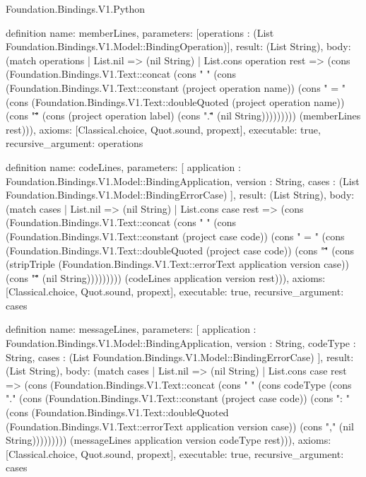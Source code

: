 \begin{lexlean}{Foundation.Bindings.V1.Python}
\begin{semanticmodule}
definition{
  name: memberLines,
  parameters: [operations : (List Foundation.Bindings.V1.Model::BindingOperation)],
  result: (List String),
  body: (match operations
    | List.nil => (nil String)
    | List.cons operation rest => (cons (Foundation.Bindings.V1.Text::concat (cons "    " (cons (Foundation.Bindings.V1.Text::constant (project operation name)) (cons " = " (cons (Foundation.Bindings.V1.Text::doubleQuoted (project operation name)) (cons "\n    \"\"\"" (cons (project operation label) (cons ".\"\"\"" (nil String))))))))) (memberLines rest))),
  axioms: [Classical.choice, Quot.sound, propext],
  executable: true,
  recursive_argument: operations
}

definition{
  name: codeLines,
  parameters: [
    application : Foundation.Bindings.V1.Model::BindingApplication,
    version : String,
    cases : (List Foundation.Bindings.V1.Model::BindingErrorCase)
  ],
  result: (List String),
  body: (match cases
    | List.nil => (nil String)
    | List.cons case rest => (cons (Foundation.Bindings.V1.Text::concat (cons "    " (cons (Foundation.Bindings.V1.Text::constant (project case code)) (cons " = " (cons (Foundation.Bindings.V1.Text::doubleQuoted (project case code)) (cons "\n    \"\"\"" (cons (stripTriple (Foundation.Bindings.V1.Text::errorText application version case)) (cons "\"\"\"" (nil String))))))))) (codeLines application version rest))),
  axioms: [Classical.choice, Quot.sound, propext],
  executable: true,
  recursive_argument: cases
}

definition{
  name: messageLines,
  parameters: [
    application : Foundation.Bindings.V1.Model::BindingApplication,
    version : String,
    codeType : String,
    cases : (List Foundation.Bindings.V1.Model::BindingErrorCase)
  ],
  result: (List String),
  body: (match cases
    | List.nil => (nil String)
    | List.cons case rest => (cons (Foundation.Bindings.V1.Text::concat (cons "    " (cons codeType (cons "." (cons (Foundation.Bindings.V1.Text::constant (project case code)) (cons ": " (cons (Foundation.Bindings.V1.Text::doubleQuoted (Foundation.Bindings.V1.Text::errorText application version case)) (cons "," (nil String))))))))) (messageLines application version codeType rest))),
  axioms: [Classical.choice, Quot.sound, propext],
  executable: true,
  recursive_argument: cases
}


\end{semanticmodule}
\end{lexlean}
